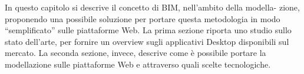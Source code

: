 In questo capitolo si descrive il concetto di BIM, nell’ambito della modella-
zione, proponendo una possibile soluzione per portare questa metodologia in modo ``semplificato'' sulle piattaforme Web.
La prima sezione riporta uno studio sullo stato dell’arte, per fornire un overview
sugli applicativi Desktop disponibili sul mercato. La seconda sezione, invece, descrive come è
possibile portare la modellazione sulle piattaforme Web e attraverso quali scelte tecnologiche.
